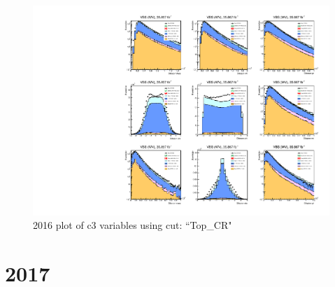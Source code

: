 \documentclass{article}
\begin{document}
            \begin{figure}[H]
                \centering
                \caption{2016 plot of c3 variables using cut: ``Top\_CR"}
                \includegraphics[width=\textwidth]{2016/c3_2016_Top_CR.pdf}
            \end{figure}
    \section*{2017}
\end{document}

